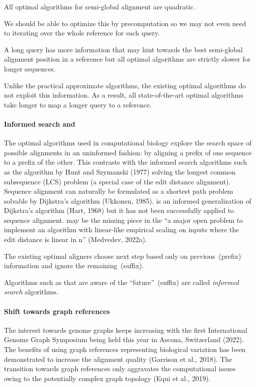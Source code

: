 \begin{observation}
    All optimal algorithms for semi-global alignment are quadratic.
\end{observation}

We should be able to optimize this by precomputation so we may not even need to
iterating over the whole reference for each query.

\begin{paradox}
    A long query has more information that may hint towards the best semi-global
    alignment position in a reference but all optimal algorithms are strictly
    slower for longer sequences.
\end{paradox}

Unlike the practical approximate algorithms, the existing optimal algorithms do
not exploit this information. As a result, all state-of-the-art optimal
algorithms take longer to map a longer query to a reference. 

\paragraph{Informed search and \A}

The optimal algorithms used in computational biology explore the search space of
possible alignments in an uninformed fashion: by aligning a prefix of one
sequence to a prefix of the other. This contrasts with the informed search
algorithms such as the algorithm by Hunt and Szymanski (1977) solving the
longest common subsequence (LCS) problem (a special case of the edit distance
alignment). Sequence alignment can naturally be formulated as a shortest path
problem solvable by Dijkstra's algorithm (Ukkonen, 1985). \A is an informed
generalization of Dijkstra's algorithm (Hart, 1968) but it has not been
successfully applied to sequence alignment. \A may be the missing piece in the
“a major open problem to implement an algorithm with linear-like empirical
scaling on inputs where the edit distance is linear in n” (Medvedev, 2022a).

\begin{observation}
    The existing optimal aligners choose next step based only on
    previous~(prefix) information and ignore the remaining~(suffix).
\end{observation}

Algorithms such as \A that are aware of the ``future''~(suffix) are called
\emph{informed search} algorithms.

\paragraph{Shift towards graph references}
The interest towards genome graphs keeps increasing with the first International
Genome Graph Symposium being held this year in Ascona, Switzerland (2022). The
benefits of using graph references representing biological variation has been
demonstrated to increase the alignment quality (Garrison et al., 2018). The
transition towards graph references only aggravates the computational issues
owing to the potentially complex graph topology (Equi et al., 2019).
